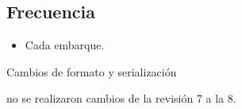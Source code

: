 \subsection{Frecuencia}

\begin{itemize}
	\item Cada embarque.
\end{itemize}

\begin{changelog}[title=Registro de cambios,simple, sectioncmd=\subsection*,label=changelog-\thesection-\MayorVer.\MenorVer0]
	\begin{version}[v=\MayorVer.\MenorVer, date=2023--01, author=Pablo E. Alanis]
		\item Cambios de formato y serialización
	\end{version}
	
	\begin{version}[v=1.8, date=2022-02, author=Alonso M.]
	\item no se realizaron cambios de la revisión 7 a la 8.
	\end{version}
\end{changelog}